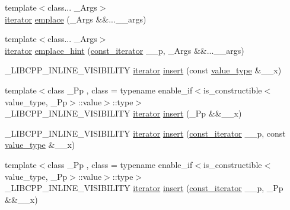 \begin{DoxyCompactItemize}
\item 
{\footnotesize template$<$class... \+\_\+\+Args$>$ }\\\hyperlink{classunordered__multimap_a7b508cae41ac3a258ca80609ec43db47}{iterator} \hyperlink{classunordered__multimap_a1ecb7c23b89f1816d63e2c70531c397a}{emplace} (\+\_\+\+Args \&\&...\+\_\+\+\_\+args)
\item 
{\footnotesize template$<$class... \+\_\+\+Args$>$ }\\\hyperlink{classunordered__multimap_a7b508cae41ac3a258ca80609ec43db47}{iterator} \hyperlink{classunordered__multimap_a0e0cf481da037599115e34eaf01a0ad3}{emplace\+\_\+hint} (\hyperlink{classunordered__multimap_a3cb373bd19680f9933781c04905fde39}{const\+\_\+iterator} \+\_\+\+\_\+p, \+\_\+\+Args \&\&...\+\_\+\+\_\+args)
\item 
\+\_\+\+L\+I\+B\+C\+P\+P\+\_\+\+I\+N\+L\+I\+N\+E\+\_\+\+V\+I\+S\+I\+B\+I\+L\+I\+T\+Y \hyperlink{classunordered__multimap_a7b508cae41ac3a258ca80609ec43db47}{iterator} \hyperlink{classunordered__multimap_a2136a2570da0e845ade5666b095493a7}{insert} (const \hyperlink{classunordered__multimap_a106d390dc0deafc47f10d3943b247ee6}{value\+\_\+type} \&\+\_\+\+\_\+x)
\item 
{\footnotesize template$<$class \+\_\+\+Pp , class  = typename enable\+\_\+if$<$is\+\_\+constructible$<$value\+\_\+type, \+\_\+\+Pp$>$\+::value$>$\+::type$>$ }\\\+\_\+\+L\+I\+B\+C\+P\+P\+\_\+\+I\+N\+L\+I\+N\+E\+\_\+\+V\+I\+S\+I\+B\+I\+L\+I\+T\+Y \hyperlink{classunordered__multimap_a7b508cae41ac3a258ca80609ec43db47}{iterator} \hyperlink{classunordered__multimap_a96f2efb59cd120ae5857e5c2f7a437d4}{insert} (\+\_\+\+Pp \&\&\+\_\+\+\_\+x)
\item 
\+\_\+\+L\+I\+B\+C\+P\+P\+\_\+\+I\+N\+L\+I\+N\+E\+\_\+\+V\+I\+S\+I\+B\+I\+L\+I\+T\+Y \hyperlink{classunordered__multimap_a7b508cae41ac3a258ca80609ec43db47}{iterator} \hyperlink{classunordered__multimap_a6af8a3445b561be28451330ad736ee3f}{insert} (\hyperlink{classunordered__multimap_a3cb373bd19680f9933781c04905fde39}{const\+\_\+iterator} \+\_\+\+\_\+p, const \hyperlink{classunordered__multimap_a106d390dc0deafc47f10d3943b247ee6}{value\+\_\+type} \&\+\_\+\+\_\+x)
\item 
{\footnotesize template$<$class \+\_\+\+Pp , class  = typename enable\+\_\+if$<$is\+\_\+constructible$<$value\+\_\+type, \+\_\+\+Pp$>$\+::value$>$\+::type$>$ }\\\+\_\+\+L\+I\+B\+C\+P\+P\+\_\+\+I\+N\+L\+I\+N\+E\+\_\+\+V\+I\+S\+I\+B\+I\+L\+I\+T\+Y \hyperlink{classunordered__multimap_a7b508cae41ac3a258ca80609ec43db47}{iterator} \hyperlink{classunordered__multimap_a1294da4704436a4aae307f1432dbc531}{insert} (\hyperlink{classunordered__multimap_a3cb373bd19680f9933781c04905fde39}{const\+\_\+iterator} \+\_\+\+\_\+p, \+\_\+\+Pp \&\&\+\_\+\+\_\+x)

\end{DoxyCompactItemize}
